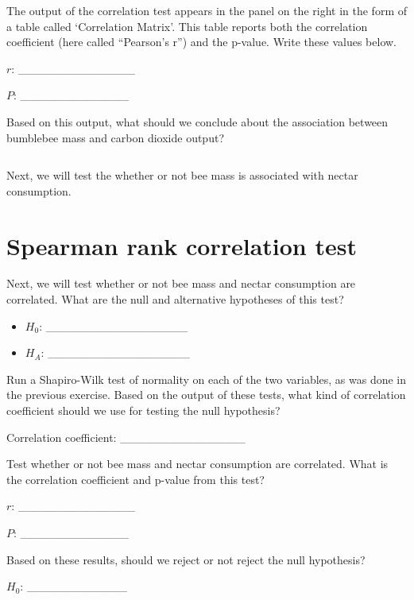\documentclass[
]{scrbook}
\begin{document}
The output of the correlation test appears in the panel on the right in the form of a table called `Correlation Matrix'.
This table reports both the correlation coefficient (here called ``Pearson's r'') and the p-value.
Write these values below.

\(r\): \_\_\_\_\_\_\_\_\_\_\_\_\_\_

\(P\): \_\_\_\_\_\_\_\_\_\_\_\_\_

Based on this output, what should we conclude about the association between bumblebee mass and carbon dioxide output?

\begin{verbatim}

\end{verbatim}

Next, we will test the whether or not bee mass is associated with nectar consumption.

\hypertarget{spearman-rank-correlation-test}{%
\section{Spearman rank correlation test}\label{spearman-rank-correlation-test}}

Next, we will test whether or not bee mass and nectar consumption are correlated.
What are the null and alternative hypotheses of this test?

\begin{itemize}
\item
  \(H_{0}\): \_\_\_\_\_\_\_\_\_\_\_\_\_\_\_\_\_
\item
  \(H_{A}\): \_\_\_\_\_\_\_\_\_\_\_\_\_\_\_\_\_
\end{itemize}

Run a Shapiro-Wilk test of normality on each of the two variables, as was done in the previous exercise.
Based on the output of these tests, what kind of correlation coefficient should we use for testing the null hypothesis?

Correlation coefficient: \_\_\_\_\_\_\_\_\_\_\_\_\_\_\_

Test whether or not bee mass and nectar consumption are correlated.
What is the correlation coefficient and p-value from this test?

\(r\): \_\_\_\_\_\_\_\_\_\_\_\_\_\_

\(P\): \_\_\_\_\_\_\_\_\_\_\_\_\_

Based on these results, should we reject or not reject the null hypothesis?

\(H_{0}\): \_\_\_\_\_\_\_\_\_\_\_\_
\end{document}
